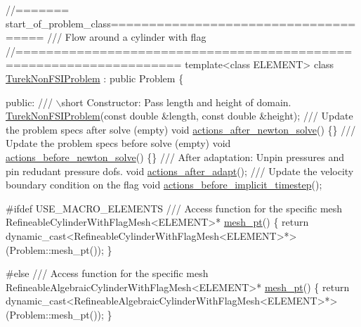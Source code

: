  
\begin{DoxyCodeInclude}
\textcolor{comment}{//======= start\_of\_problem\_class=====================================}
\textcolor{comment}{/// Flow around a cylinder with flag}
\textcolor{comment}{}\textcolor{comment}{//===================================================================}
\textcolor{keyword}{template}<\textcolor{keyword}{class} ELEMENT>
\textcolor{keyword}{class }\hyperlink{classTurekNonFSIProblem}{TurekNonFSIProblem} : \textcolor{keyword}{public} Problem
\{

\textcolor{keyword}{public}:
\textcolor{comment}{}
\textcolor{comment}{ /// \(\backslash\)short Constructor: Pass length and height of domain.}
\textcolor{comment}{} \hyperlink{classTurekNonFSIProblem_aacb3214544ef81c2f8b49777457e8be6}{TurekNonFSIProblem}(\textcolor{keyword}{const} \textcolor{keywordtype}{double} &length, 
                         \textcolor{keyword}{const} \textcolor{keywordtype}{double} &height);
 \textcolor{comment}{}
\textcolor{comment}{ /// Update the problem specs after solve (empty)}
\textcolor{comment}{} \textcolor{keywordtype}{void} \hyperlink{classTurekNonFSIProblem_a161cfe46817a5129dcc33c7ce3a17173}{actions\_after\_newton\_solve}() \{\}
\textcolor{comment}{}
\textcolor{comment}{ /// Update the problem specs before solve (empty)}
\textcolor{comment}{} \textcolor{keywordtype}{void} \hyperlink{classTurekNonFSIProblem_ae5881b3424aee1ba7b947fff96493d2f}{actions\_before\_newton\_solve}() \{\}
\textcolor{comment}{}
\textcolor{comment}{ /// After adaptation: Unpin pressures and pin redudant pressure dofs.}
\textcolor{comment}{} \textcolor{keywordtype}{void} \hyperlink{classTurekNonFSIProblem_a88ed5ef8b1be34f5176c29ffec20eedd}{actions\_after\_adapt}();
\textcolor{comment}{}
\textcolor{comment}{ /// Update the velocity boundary condition on the flag}
\textcolor{comment}{} \textcolor{keywordtype}{void} \hyperlink{classTurekNonFSIProblem_a29725cde9071c3a83792469787ea6c7d}{actions\_before\_implicit\_timestep}();


\textcolor{preprocessor}{#ifdef USE\_MACRO\_ELEMENTS}
\textcolor{comment}{}
\textcolor{comment}{ /// Access function for the specific mesh}
\textcolor{comment}{} RefineableCylinderWithFlagMesh<ELEMENT>* \hyperlink{classTurekNonFSIProblem_a6b9af904a3091d55a61b35c2ce7d7fcb}{mesh\_pt}() 
  \{
   \textcolor{keywordflow}{return} \textcolor{keyword}{dynamic\_cast<}RefineableCylinderWithFlagMesh<ELEMENT>*\textcolor{keyword}{>}
    (Problem::mesh\_pt());
  \}

\textcolor{preprocessor}{#else}
\textcolor{comment}{}
\textcolor{comment}{ /// Access function for the specific mesh}
\textcolor{comment}{} RefineableAlgebraicCylinderWithFlagMesh<ELEMENT>* \hyperlink{classTurekNonFSIProblem_a6b9af904a3091d55a61b35c2ce7d7fcb}{mesh\_pt}() 
  \{
   \textcolor{keywordflow}{return} \textcolor{keyword}{dynamic\_cast<}RefineableAlgebraicCylinderWithFlagMesh<ELEMENT>*\textcolor{keyword}{>}
    (Problem::mesh\_pt());
  \}
 

\end{DoxyCodeInclude}
